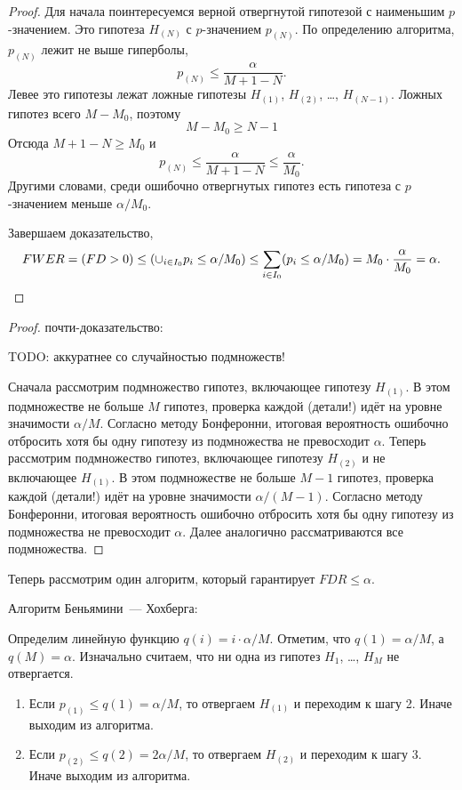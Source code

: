 \documentclass[12pt]{article}
\let\P\relax
\DeclareMathOperator{\P}{\mathbb{P}}
\begin{document}
\begin{proof}
Для начала поинтересуемся верной отвергнутой гипотезой с наименьшим $p$-значением. 
Это гипотеза $H_{(N)}$ с $p$-значением $p_{(N)}$. 
По определению алгоритма, $p_{(N)}$ лежит не выше гиперболы, 
\[
p_{(N)} \leq \frac{\alpha}{M + 1 - N}.
\]
Левее это гипотезы лежат ложные гипотезы $H_{(1)}$, $H_{(2)}$, \dots, $H_{(N-1)}$.
Ложных гипотез всего $M - M_0$, поэтому 
\[
M - M_0 \geq N - 1
\]
Отсюда $M + 1 - N \geq M_0$ и 
\[
p_{(N)} \leq \frac{\alpha}{M + 1 - N} \leq \frac{\alpha}{M_0}.
\]
Другими словами, среди ошибочно отвергнутых гипотез есть гипотеза с $p$-значением меньше $\alpha/ M_0$.

Завершаем доказательство, 
\[
FWER = \P(FD > 0) \leq \P(\cup_{i \in I_0} p_i \leq \alpha / M_0) \leq \sum_{i \in I_0} \P(p_i \leq \alpha /M_0) = M_0 \cdot \frac{\alpha}{M_0} = \alpha.
\]
    
\end{proof}



\begin{proof}
    почти-доказательство:

    TODO: аккуратнее со случайностью подмножеств!

    Сначала рассмотрим подмножество гипотез, включающее гипотезу $H_{(1)}$. 
    В этом подмножестве не больше $M$ гипотез, проверка каждой (детали!) идёт на уровне значимости $\alpha / M$.
    Согласно методу Бонферонни, итоговая вероятность ошибочно отбросить хотя бы одну гипотезу из подмножества не превосходит $\alpha$.
    Теперь рассмотрим подмножество гипотез, включающее гипотезу $H_{(2)}$ и не включающее $H_{(1)}$. 
    В этом подмножестве не больше $M - 1$ гипотез, проверка каждой (детали!) идёт на уровне значимости $\alpha / (M - 1)$.
    Согласно методу Бонферонни, итоговая вероятность ошибочно отбросить хотя бы одну гипотезу из подмножества не превосходит $\alpha$.
    Далее аналогично рассматриваются все подмножества.     
\end{proof}





Теперь рассмотрим один алгоритм, который гарантирует $FDR \leq \alpha$.

Алгоритм Беньямини~— Хохберга:

Определим линейную функцию $q(i) = i \cdot \alpha / M$.
Отметим, что $q(1) = \alpha/M$, а $q(M) = \alpha$. 
Изначально считаем, что ни одна из гипотез $H_1$, \dots, $H_M$ не отвергается.
\begin{enumerate}
    \item Если $p_{(1)} \leq q(1) = \alpha / M$, то отвергаем $H_{(1)}$ и переходим к шагу 2. 
    Иначе выходим из алгоритма.
    \item Если $p_{(2)} \leq q(2) = 2\alpha / M$, то отвергаем $H_{(2)}$ и переходим к шагу 3. 
    Иначе выходим из алгоритма.

\end{enumerate}
\end{document}
